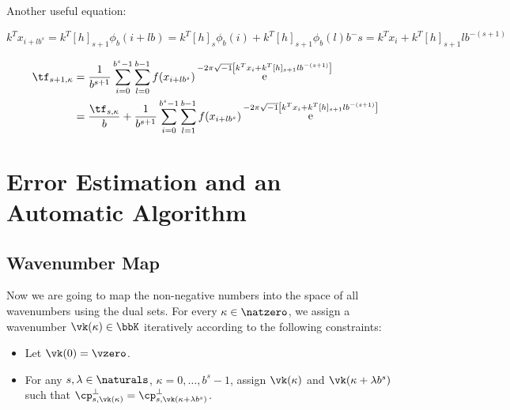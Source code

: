 \documentclass[]{elsarticle}
\DeclareMathOperator{\e}{e}
\newcommand{\cfourier}[1]{\ensuremath{\e^{-2\pi\sqrt{-1}#1}}}
\theoremstyle{definition}
\theoremstyle{remark}
\begin{document}
Another useful equation:

\begin{equation*}
k^Tx_{i+lb^s}=k^T[h]_{s+1}\phi_b(i+lb)=k^T[h]_s\phi_b(i)+k^T[h]_{s+1}\phi_b(l)b^-s=k^Tx_{i}+k^T[h]_{s+1}lb^{-(s+1)}
\end{equation*}

\begin{equation*}
\begin{split}
\tf_{s+1,\kappa}&=\frac{1}{b^{s+1}}\sum_{i=0}^{b^s-1}\sum_{l=0}^{b-1}f(x_{i+lb^s})\cfourier{\left[k^Tx_{i}+k^T[h]_{s+1}lb^{-(s+1)}\right]}\\
&=\frac{\tf_{s,\kappa}}{b}+\frac{1}{b^{s+1}}\sum_{i=0}^{b^s-1}\sum_{l=1}^{b-1}f(x_{i+lb^s})\cfourier{\left[k^Tx_{i}+k^T[h]_{s+1}lb^{-(s+1)}\right]}
\end{split}
\end{equation*}

\section{Error Estimation and an Automatic Algorithm}

\subsection{Wavenumber Map}

Now we are going to map the non-negative numbers into the space of all wavenumbers using the dual sets.  For every $\kappa \in \natzero$, we assign a wavenumber $\vk(\kappa) \in \bbK$ iteratively according to the following constraints:
\begin{itemize}

\item Let $\vk(0)= \vzero$.

\item For any $s,\lambda \in \naturals$, $\kappa=0, \ldots, b^s-1$, assign $\vk(\kappa)$ and $\vk(\kappa+ \lambda b^s)$ such that $\cp^{\perp}_{s,\vk(\kappa)}=\cp^{\perp}_{s,\vk(\kappa+ \lambda b^s)}$.
\end{itemize}
\end{document}

